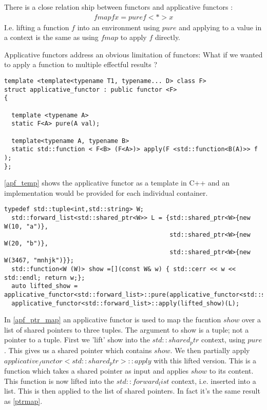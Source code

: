 \documentclass[12pt,fleqn]{article}
\begin{document}
There is a close relation ship between functors and applicative functors :
\begin{eqnarray*}
  fmap f x = pure f <*> x
\end{eqnarray*} 
I.e. lifting a function $f$ into an environment using $pure$ and applying to a value in a context is the same as using $fmap$ to apply $f$ directly.

Applicative functors address an obvious limitation of functors: What if we wanted to apply a function to multiple effectful results ?

\begin{lstlisting}[caption=applicative functor template in C++, label=apf_temp]
template <template<typename T1, typename... D> class F> 
struct applicative_functor : public functor <F>
{

  template <typename A> 
  static F<A> pure(A val);

  template<typename A, typename B>
  static std::function < F<B> (F<A>)> apply(F <std::function<B(A)>> f );
};
\end{lstlisting}

\ref{apf_temp} shows the applicative functor as a template in C++ and an implementation would be provided for each individual container.


\begin{lstlisting}[caption=using an applicative functor to map over a list of shared pointers , label=apf_ptr_map]
typedef std::tuple<int,std::string> W;
  std::forward_list<std::shared_ptr<W>> L = {std::shared_ptr<W>{new W(10, "a")}, 
                                             std::shared_ptr<W>{new W(20, "b")}, 
                                             std::shared_ptr<W>{new W(3467, "mnhjk")}};
  std::function<W (W)> show =[](const W& w) { std::cerr << w << std::endl; return w;};
  auto lifted_show = applicative_functor<std::forward_list>::pure(applicative_functor<std::shared_ptr>::apply(applicative_functor<std::shared_ptr>::pure(show)));
  applicative_functor<std::forward_list>::apply(lifted_show)(L);
\end{lstlisting}

In \ref{apf_ptr_map} an applicative functor is used to map the fucntion $show$ over a list of shared pointers to three tuples.
The argument to show is a tuple; not a pointer to a tuple.
First we 'lift' show into the $std::shared_ptr$ context, using $pure$.
This gives us a shared pointer which contains $show$.
We then partially apply $applicative_functor<std::shared_ptr>::apply$ with this lifted version.
This is a function which takes a shared pointer as input and applies $show$ to its content.
This function is now lifted into the $std::forward_list$ context, i.e. inserted into a list.
This is then applied to the list of shared pointers.
In fact it's the same result as \ref{ptrmap}.
\end{document}
